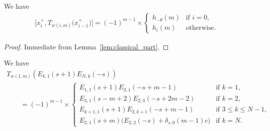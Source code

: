 \begin{lem}\label{lem:braket_pre}
We have
\begin{gather*} \big[x_{i}^+, T_{w(i,m)}\big(x_{i-1}^+\big)\big] = (-1)^{m-1} \times \begin{cases}
h_{-\theta}(m) & \text{if $i=0$},\\
h_i(m) & \text{otherwise}.
\end{cases}
\end{gather*}
\end{lem}

\begin{proof}
Immediate from Lemma~\ref{lem:classical_part}.
\end{proof}

\begin{lem}\label{lem:i=1}We have
\begin{gather*}
T_{w(1,m)}(E_{k,1}(s+1)E_{N,k}(-s)) \\
\qquad{} = (-1)^{m-1} \times\begin{cases}
E_{1,1}(s+1)E_{2,1}(-s+m-1) & \text{if $k=1$},\\
E_{3,1}(s-m+2)E_{2,3}(-s+2m-2) & \text{if $k=2$},\\
E_{k+1,1}(s+1)E_{2,k+1}(-s+m-1) & \text{if $3 \leq k \leq N-1$},\\
E_{2,1}(s+m)\Big( E_{2,2}(-s) + \delta_{s,0}(m-1)c \Big) & \text{if $k=N$}.
\end{cases}
\end{gather*}
\end{lem}


